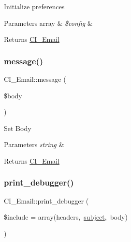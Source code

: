 Initialize preferences


\begin{DoxyParams}[1]{Parameters}
array & {\em \$config} & \\
\hline
\end{DoxyParams}
\begin{DoxyReturn}{Returns}
\mbox{\hyperlink{class_c_i___email}{C\+I\+\_\+\+Email}} 
\end{DoxyReturn}
\mbox{\label{class_c_i___email_a736023efc585e0dafa3a5d3da8fcfbc1}} 
\subsubsection{\texorpdfstring{message()}{message()}}
{\footnotesize\ttfamily C\+I\+\_\+\+Email\+::message (\begin{DoxyParamCaption}\item[{}]{\$body }\end{DoxyParamCaption})}

Set Body


\begin{DoxyParams}{Parameters}
{\em string} & \\
\hline
\end{DoxyParams}
\begin{DoxyReturn}{Returns}
\mbox{\hyperlink{class_c_i___email}{C\+I\+\_\+\+Email}} 
\end{DoxyReturn}
\mbox{\label{class_c_i___email_a33fc71767a8375f1a120826609f8175b}} 
\subsubsection{\texorpdfstring{print\+\_\+debugger()}{print\_debugger()}}
{\footnotesize\ttfamily C\+I\+\_\+\+Email\+::print\+\_\+debugger (\begin{DoxyParamCaption}\item[{}]{\$include = {\ttfamily array(\textquotesingle{}headers\textquotesingle{},~\textquotesingle{}\mbox{\hyperlink{class_c_i___email_a14795b95ebaa3941a2c5a11ee7ddbeae}{subject}}\textquotesingle{},~\textquotesingle{}body\textquotesingle{})} }\end{DoxyParamCaption})}

